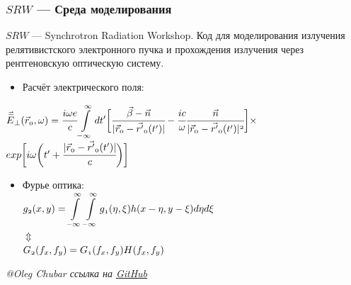 \documentclass[14pt, hyperref = {colorlinks},xcolor=table ]{beamer}
\begin{document}
\small
\begin{frame}
\frametitle{$SRW$ --- Среда моделирования}\label{t1}
$SRW$ --- Synchrotron Radiation Workshop. Код для моделирования излучения релятивистского электронного пучка и прохождения излучения через рентгеновскую оптическую систему.
\begin{itemize}
	\item Расчёт электрического поля:\\
\end{itemize}
	\hspace{25pt}$\mathnormal{\vec{\widetilde{E}}_{\bot}(\vec{r}_0, \omega) = 
	\cfrac{i\omega e}{c}\displaystyle\int\limits_{-\infty}^{\infty} dt'\bigg[\cfrac{\vec{\beta} - \vec{n}}{|\vec{r}_0 - \vec{r'}_0(t')|} - \cfrac{ic}{\omega}\cfrac{\vec{n}}{|\vec{r}_0 - \vec{r'}_0(t')|^2}\bigg]\times}$\\
	\vspace{5pt}
	\hspace{175pt}$\mathnormal{exp\bigg[i\omega\bigg(t' + \cfrac{|\vec{r}_0 - \vec{r'}_0(t')|}{c}\bigg)\bigg]}$
\vspace{-10pt}
\begin{itemize}	
	\item Фурье оптика:\\
	\centering
	\vspace{-10pt}
	$\mathnormal{g_2(x, y) = \displaystyle\int\limits_{-\infty}^{\infty}\displaystyle\int\limits_{-\infty}^{\infty}
		g_1(\eta, \xi) h(x - \eta, y - \xi)}d\eta d\xi$ \\
	\vspace{-6pt}
	$\Updownarrow$\\
	\vspace{6pt}
	$\mathnormal{G_2(f_x, f_y) = G_1(f_x, f_y)H(f_x, f_y)}$
\end{itemize}
\tiny{\textit{@Oleg Chubar ссылка на \href{https://github.com/ochubar/SRW.git}{GitHub}}}
\end{frame}
\end{document}
